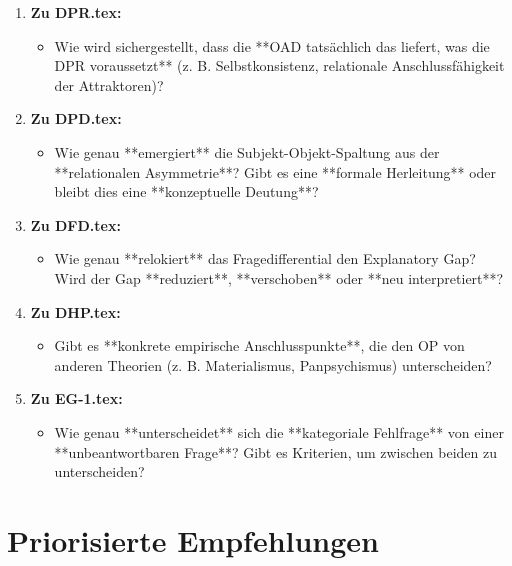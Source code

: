 \documentclass[11pt,a4paper]{article}
\begin{document}
\begin{enumerate}
    \item \textbf{Zu DPR.tex:}
    \begin{itemize}
        \item Wie wird sichergestellt, dass die **OAD tatsächlich das liefert, was die DPR voraussetzt** (z. B. Selbstkonsistenz, relationale Anschlussfähigkeit der Attraktoren)?
    \end{itemize}

    \item \textbf{Zu DPD.tex:}
    \begin{itemize}
        \item Wie genau **emergiert** die Subjekt-Objekt-Spaltung aus der **relationalen Asymmetrie**? Gibt es eine **formale Herleitung** oder bleibt dies eine **konzeptuelle Deutung**?
    \end{itemize}

    \item \textbf{Zu DFD.tex:}
    \begin{itemize}
        \item Wie genau **relokiert** das Fragedifferential den Explanatory Gap? Wird der Gap **reduziert**, **verschoben** oder **neu interpretiert**?
    \end{itemize}

    \item \textbf{Zu DHP.tex:}
    \begin{itemize}
        \item Gibt es **konkrete empirische Anschlusspunkte**, die den OP von anderen Theorien (z. B. Materialismus, Panpsychismus) unterscheiden?
    \end{itemize}

    \item \textbf{Zu EG-1.tex:}
    \begin{itemize}
        \item Wie genau **unterscheidet** sich die **kategoriale Fehlfrage** von einer **unbeantwortbaren Frage**? Gibt es Kriterien, um zwischen beiden zu unterscheiden?
    \end{itemize}
\end{enumerate}

\section*{Priorisierte Empfehlungen}
\end{document}
